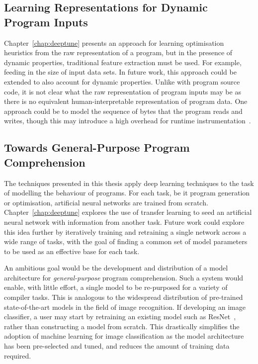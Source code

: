 \subsection{Learning Representations for Dynamic Program Inputs}

Chapter~\ref{chap:deeptune} presents an approach for learning optimisation heuristics from the raw representation of a program, but in the presence of dynamic properties, traditional feature extraction must be used. For example, feeding in the size of input data sets. In future work, this approach could be extended to also account for dynamic properties. Unlike with program source code, it is not clear what the raw representation of program inputs may be as there is no equivalent human-interpretable representation of program data. One approach could be to model the sequence of bytes that the program reads and writes, though this may introduce a high overhead for runtime instrumentation~\cite{Gad2014}.


\subsection{Towards General-Purpose Program Comprehension}

The techniques presented in this thesis apply deep learning techniques to the task of modelling the behaviour of programs. For each task, be it program generation or optimisation, artificial neural networks are trained from scratch. Chapter~\ref{chap:deeptune} explores the use of transfer learning to seed an artificial neural network with information from another task. Future work could explore this idea further by iteratively training and retraining a single network across a wide range of tasks, with the goal of finding a common set of model parameters to be used as an effective base for each task.

An ambitious goal would be the development and distribution of a model architecture for \emph{general-purpose} program comprehension. Such a system would enable, with little effort, a single model to be re-purposed for a variety of compiler tasks. This is analogous to the widespread distribution of pre-trained state-of-the-art models in the field of image recognition. If developing an image classifier, a user may start by retraining an existing model such as ResNet~\cite{He2016}, rather than constructing a model from scratch. This drastically simplifies the adoption of machine learning for image classification as the model architecture has been pre-selected and tuned, and reduces the amount of training data required.

